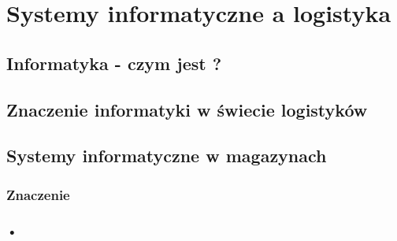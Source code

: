 \chapter{Systemy informatyczne a logistyka}
\label{c3:c3}

\section{Informatyka - czym jest ?}

\section{Znaczenie informatyki w świecie logistyków}

\section{Systemy informatyczne w magazynach}
	\subsection{Znaczenie}
	\subsection{•}